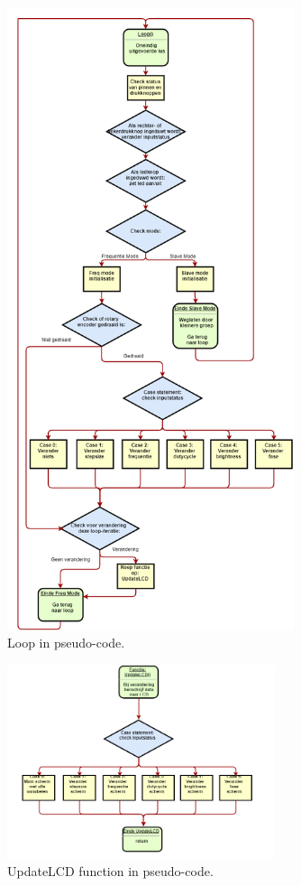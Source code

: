 \documentclass[a4paper,dutch]{article}
\begin{document}
\begin{appendices}
\begin{figure}[H]
\centering
\includegraphics[width=0.75\textwidth]{Loop.png}
\caption{\label{fig:loop}Loop in pseudo-code.}
\end{figure}

\begin{figure}[H]
\centering
\includegraphics[width=0.7\textwidth]{UpdateLCD.png}
\caption{\label{fig:lcd}UpdateLCD function in pseudo-code.}
\end{figure}


\end{appendices}
\end{document}
